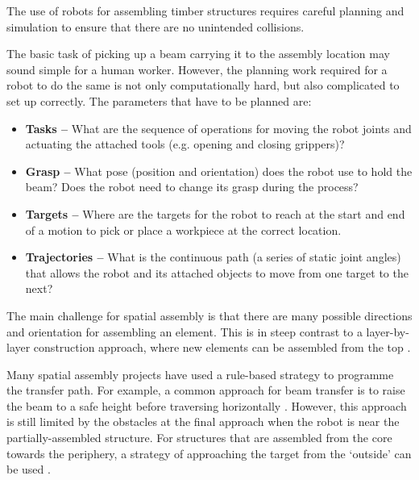 The use of robots for assembling timber structures requires careful planning and simulation to ensure that there are no unintended collisions. 

The basic task of picking up a beam carrying it to the assembly location may sound simple for a human worker. However, the planning work required for a robot to do the same is not only computationally hard, but also complicated to set up correctly. The parameters that have to be planned are:

\begin{itemize}
	\item \textbf{Tasks --} What are the sequence of operations for moving the robot joints and actuating the attached tools (e.g. opening and closing grippers)?

	\item \textbf{Grasp --} What pose (position and orientation) does the robot use to hold the beam? Does the robot need to change its grasp during the process?

	\item \textbf{Targets --} Where are the targets for the robot to reach at the start and end of a motion to pick or place a workpiece at the correct location.

	\item \textbf{Trajectories --} What is the continuous path (a series of static joint angles) that allows the robot and its attached objects to move from one target to the next?

\end{itemize}
The main challenge for spatial assembly is that there are many possible directions and orientation for assembling an element. This is in steep contrast to a layer-by-layer construction approach, where new elements can be assembled from the top \parencite{apolinarskaSequentialRoof2016, gramaziokohlerresearchethzurichStackedPavilion2009}. 

Many spatial assembly projects have used a rule-based strategy to programme the transfer path. For example, a common approach for beam transfer is to raise the beam to a safe height before traversing horizontally \parencite{hackStructuralStayinplaceFormwork2020, sondergaardTopologyOptimizationRobotic2016}. However, this approach is still limited by the obstacles at the final approach when the robot is near the partially-assembled structure. For structures that are assembled from the core towards the periphery, a strategy of approaching the target from the ‘outside’ can be used \parencite{adelDesignRoboticallyFabricated2018}. 

